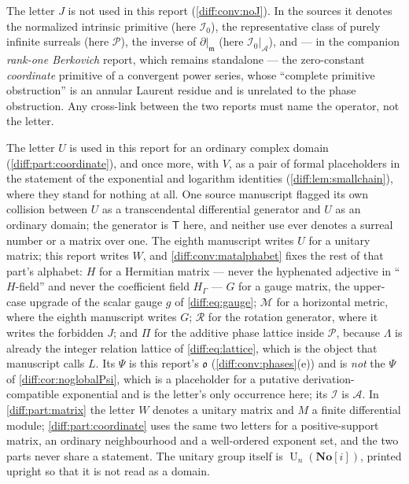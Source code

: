 \documentclass[11pt,letterpaper]{article}
\numberwithin{equation}{section}
\theoremstyle{definition}
\theoremstyle{remark}
\newcommand{\SC}{\mathbf{No}[i]}
\newcommand{\der}{\partial}
\newcommand{\mm}{\mathfrak m}
\newcommand{\Pcl}{\mathcal P}
\newcommand{\Acl}{\mathcal A}
\newcommand{\Izero}{\mathcal I_{0}}
\newcommand{\Obs}{\mathfrak o}
\newcommand{\Un}{\operatorname{U}}
\newcommand{\Rot}{\mathcal R}
\begin{document}
\begin{warning}
The letter $J$ is not used in this report
(\cref{diff:conv:noJ}). In the sources it denotes the normalized intrinsic
primitive (here $\Izero$), the representative class of purely infinite
surreals (here $\Pcl$), the inverse of $\der|_{\mm}$ (here
$\Izero|_{\Acl}$), and --- in the companion \emph{rank-one Berkovich} report,
which remains standalone --- the zero-constant \emph{coordinate} primitive of
a convergent power series, whose ``complete primitive obstruction'' is an
annular Laurent residue and is unrelated to the phase obstruction. Any
cross-link between the two reports must name the operator, not the letter.

The letter $U$ is used in this report for an ordinary complex domain
(\cref{diff:part:coordinate}), and once more, with $V$, as a pair of formal
placeholders in the statement of the exponential and logarithm identities
(\cref{diff:lem:smallchain}), where they stand for nothing at all. One source manuscript flagged its own collision
between $U$ as a transcendental differential generator and $U$ as an ordinary
domain; the generator is $\mathsf T$ here, and neither use ever denotes a
surreal number or a matrix over one. The eighth manuscript writes $U$ for a
unitary matrix; this report writes $W$, and
\cref{diff:conv:matalphabet} fixes the rest of that part's alphabet:
$H$ for a Hermitian matrix --- never the hyphenated adjective in ``$H$-field''
and never the coefficient field $H_{\Gamma}$ --- $G$ for a gauge matrix, the
upper-case upgrade of the scalar gauge $g$ of \cref{diff:eq:gauge};
$\mathcal M$ for a horizontal metric, where the eighth manuscript writes $G$;
$\Rot$ for the rotation generator, where it writes the forbidden $J$; and
$\Pi$ for the additive phase lattice inside $\Pcl$, because $\Lambda$ is
already the integer relation lattice of \cref{diff:eq:lattice}, which is the
object that manuscript calls $L$. Its $\Psi$ is this report's $\Obs$
(\cref{diff:conv:phases}(e)) and is \emph{not} the $\Psi$ of
\cref{diff:cor:noglobalPsi}, which is a placeholder for a putative
derivation-compatible exponential and is the letter's only occurrence here; its
$\mathcal I$ is $\Acl$. In
\cref{diff:part:matrix} the letter $W$ denotes a unitary matrix and $M$ a
finite differential module; \cref{diff:part:coordinate} uses the same two
letters for a positive-support matrix, an ordinary neighbourhood and a
well-ordered exponent set, and the two parts never share a statement. The
unitary group itself is $\Un_{n}(\SC)$, printed upright so that it is not read
as a domain.


\end{warning}
\end{document}
